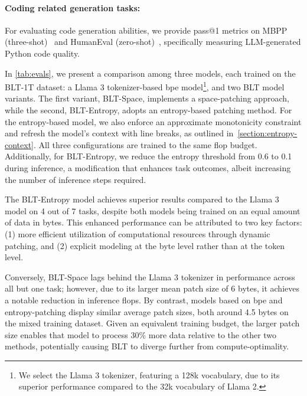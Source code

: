 \paragraph{Coding related generation tasks:} For evaluating code generation abilities, we provide pass@1 metrics on MBPP (three-shot)~\citep{Eval_MBPP} and HumanEval (zero-shot)~\citep{Eval_HumanEval}, specifically measuring LLM-generated Python code quality.

In \autoref{tab:evals}, we present a comparison among three models, each trained on the {\textsc BLT}-1T dataset: a Llama 3 tokenizer-based bpe model\footnote{We select the Llama 3 tokenizer, featuring a 128k vocabulary, due to its superior performance compared to the 32k vocabulary of Llama 2.}, and two {\textsc BLT} model variants. The first variant, {\textsc BLT}-Space, implements a space-patching approach, while the second, {\textsc BLT}-Entropy, adopts an entropy-based patching method. For the entropy-based model, we also enforce an approximate monotonicity constraint and refresh the model’s context with line breaks, as outlined in~\autoref{section:entropy-context}. All three configurations are trained to the same flop budget. Additionally, for {\textsc BLT}-Entropy, we reduce the entropy threshold from 0.6 to 0.1 during inference, a modification that enhances task outcomes, albeit increasing the number of inference steps required.

The {\textsc BLT}-Entropy model achieves superior results compared to the Llama 3 model on 4 out of 7 tasks, despite both models being trained on an equal amount of data in bytes. This enhanced performance can be attributed to two key factors: (1) more efficient utilization of computational resources through dynamic patching, and (2) explicit modeling at the byte level rather than at the token level.

Conversely, {\textsc BLT}-Space lags behind the Llama 3 tokenizer in performance across all but one task; however, due to its larger mean patch size of 6 bytes, it achieves a notable reduction in inference flops. By contrast, models based on bpe and entropy-patching display similar average patch sizes, both around 4.5 bytes on the mixed training dataset. Given an equivalent training budget, the larger patch size enables that model to process 30\% more data relative to the other two methods, potentially causing {\textsc BLT} to diverge further from compute-optimality.

